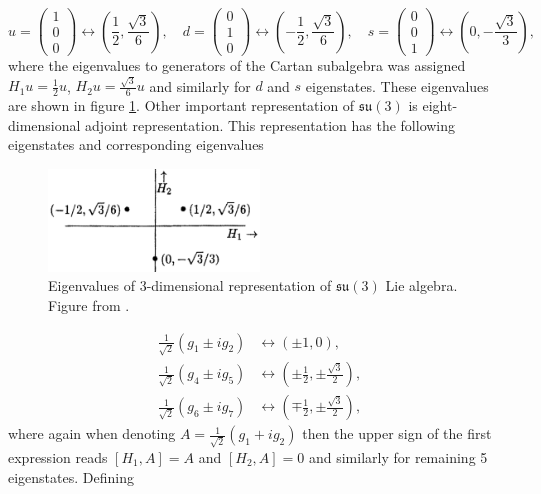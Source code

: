 \documentclass[a4paper,11pt]{report}
\begin{document}
\begin{equation}
  u = \begin{pmatrix} 1 \\ 0 \\ 0 \end{pmatrix} \leftrightarrow \left(
    \frac{1}{2}, \frac{\sqrt{3}}{6} \right), \quad
  d = \begin{pmatrix} 0 \\ 1 \\ 0 \end{pmatrix} \leftrightarrow \left(
    - \frac{1}{2}, \frac{\sqrt{3}}{6} \right), \quad
  s = \begin{pmatrix} 0 \\ 0 \\ 1 \end{pmatrix} \leftrightarrow \left(
    0, - \frac{\sqrt{3}}{3} \right), \quad
  \label{eq:RepresentLie3}
\end{equation}
where the eigenvalues to generators of the Cartan subalgebra was assigned $H_1 u
= \frac{1}{2} u$, $H_2 u = \frac{\sqrt{3}}{6} u$ and similarly for $d$ and $s$
eigenstates. These eigenvalues are shown in figure \ref{fig:QuarkTriplet}. Other
important representation of $\mathfrak{su}(3)$ is eight-dimensional adjoint
representation. This representation has the following eigenstates and
corresponding eigenvalues

\begin{figure}[t]
  \centering
  \includegraphics[width=0.5\textwidth]{Chapter1/Quark-triplet.png} 
  \caption{Eigenvalues of 3-dimensional representation of $\mathfrak{su}(3)$ Lie algebra. Figure
    from \cite{LieAlgebrasForParticlePhysicists}.}
  \label{fig:QuarkTriplet}
\end{figure}

\begin{align}
  \frac{1}{\sqrt{2}} \left( g_1 \pm i g_2  \right)
    &\leftrightarrow \left( \pm 1, 0 \right), \nonumber \\
  \frac{1}{\sqrt{2}} \left( g_4 \pm i g_5 \right) 
    &\leftrightarrow \left( \pm \frac{1}{2}, \pm \frac{\sqrt{3}}{2} \right), 
    \label{eq:RepresentLie8} \\
  \frac{1}{\sqrt{2}} \left( g_6 \pm i g_7 \right) 
    &\leftrightarrow \left( \mp \frac{1}{2}, \pm \frac{\sqrt{3}}{2} \right), \nonumber
\end{align}
where again when denoting $A = \frac{1}{\sqrt{2}} ( g_1 + i g_2 )$ then the
upper sign of the first expression reads $[ H_1, A ] = A$ and $[ H_2, A ] = 0$ and
similarly for remaining 5 eigenstates. Defining 
\end{document}
